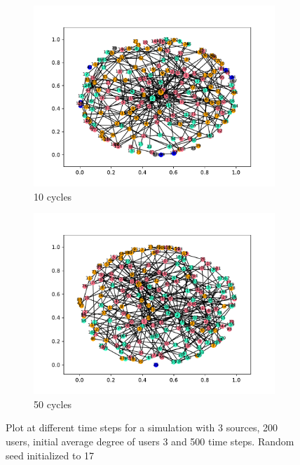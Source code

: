 \begin{figure}[!h]
  \begin{subfigure}[t]{.45\textwidth}
    \centering
    \includegraphics[trim={1cm .5cm 1cm 1cm}, clip, width=\linewidth]{img/pdf/plot-0010.pdf} 
    \caption{10 cycles} \label{fig:300}
  \end{subfigure}
  \begin{subfigure}[t]{.45\textwidth}
    \centering
    \includegraphics[trim={1cm .5cm 1cm 1cm}, clip, width=\linewidth]{img/pdf/plot-0050.pdf} 
    \caption{50 cycles} \label{fig:400}
  \end{subfigure}
 
  \caption{Plot at different time steps for a simulation with 3 sources, 200 users, initial average degree of users 3 and 500 time steps. Random seed initialized to 17}
\end{figure}

